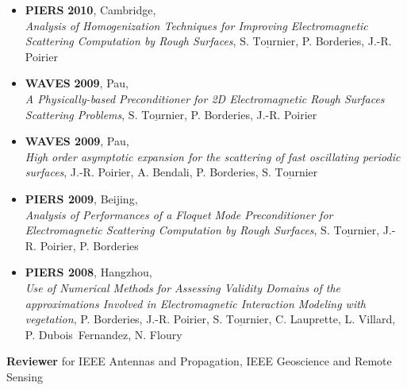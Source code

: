 \documentclass[a4paper,10pt,twoside]{article}
\newcommand{\categorie}[1]{\vspace*{0.1cm}\noindent%
	{\center  \colorbox[gray]{0.9}{\makebox[\textwidth][c]{\Large
              \sc {#1}}}\par}\vspace*{.5cm}}
\newcommand\moi{$\underline{\textrm{S. Tournier}}$}
\begin{document}
\begin{itemize}
\item[\textbullet]
 \textbf{PIERS}
\textbf{2010}, Cambridge, \\
\emph{Analysis of Homogenization Techniques for Improving Electromagnetic Scattering Computation by Rough Surfaces},
\moi, P. Borderies, J.-R. Poirier

\item[\textbullet]
 \textbf{WAVES}
 \textbf{2009}, Pau,\\
 \emph{A Physically-based Preconditioner for 2D Electromagnetic Rough Surfaces Scattering Problems},
 \moi, P. Borderies, J.-R. Poirier

\item[\textbullet]
 \textbf{WAVES 2009}, Pau,\\
\emph{High order asymptotic expansion for the scattering of fast oscillating periodic surfaces},
 J.-R. Poirier, A. Bendali, P. Borderies,  \moi

\item[\textbullet]
\textbf{PIERS 2009}, Beijing,\\
\emph{Analysis of Performances of a Floquet Mode Preconditioner for Electromagnetic Scattering Computation by Rough Surfaces},
 \moi, J.-R. Poirier, P. Borderies

\item[\textbullet]
 \textbf{PIERS 2008}, Hangzhou,\\
\emph{Use of Numerical Methods for Assessing Validity Domains of the approximations Involved in Electromagnetic Interaction Modeling with vegetation},
 P. Borderies, J.-R. Poirier, \moi, C. Lauprette, L. Villard, P. Dubois~Fernandez, N. Floury
\end{itemize}

\vspace{0.1cm}

\noindent
\textbf{Reviewer} for
IEEE Antennas and Propagation,
IEEE Geoscience and Remote Sensing


\categorie{Others}
\noindent
\end{document}
